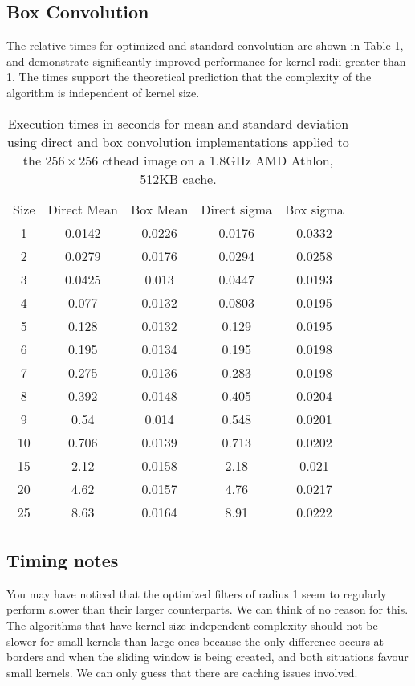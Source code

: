 \documentclass{InsightArticle}
\begin{document}
\subsection{Box Convolution}
The relative times for optimized and standard convolution are shown in
Table \ref{tab:perfBoxConv}, and demonstrate significantly improved
performance for kernel radii greater than 1. The times support the
theoretical prediction that the complexity of the algorithm is
independent of kernel size.
\begin{table}[htbp]
\centering
\begin{tabular}{ccccc}
\hline
Size  &  Direct Mean &  Box Mean & Direct sigma & Box sigma\\
1    &   0.0142 & 0.0226 & 0.0176 & 0.0332 \\
2    &   0.0279 & 0.0176 & 0.0294 & 0.0258 \\
3    &   0.0425 & 0.013  & 0.0447 & 0.0193 \\
4    &   0.077  & 0.0132 & 0.0803 & 0.0195 \\
5    &   0.128  & 0.0132 & 0.129  & 0.0195 \\
6    &   0.195  & 0.0134 & 0.195  & 0.0198 \\
7    &   0.275  & 0.0136 & 0.283  & 0.0198 \\
8    &   0.392  & 0.0148 & 0.405  & 0.0204 \\
9    &   0.54   & 0.014  & 0.548  & 0.0201 \\
10   &   0.706  & 0.0139 & 0.713  & 0.0202 \\
15   &   2.12   & 0.0158 & 2.18   & 0.021 \\
20   &   4.62   & 0.0157 & 4.76   & 0.0217 \\
25   &   8.63   & 0.0164 & 8.91   & 0.0222 \\
\hline
\hline
\end{tabular}
\caption{Execution times in seconds for mean and standard deviation using direct and box convolution implementations applied to the $256 \times 256$ cthead image on a 1.8GHz AMD Athlon, 512KB cache.\label{tab:perfBoxConv}}
\end{table}
\subsection{Timing notes}
You may have noticed that the optimized filters of radius 1 seem to
regularly perform slower than their larger counterparts. We can think
of no reason for this. The algorithms that have kernel size
independent complexity should not be slower for small kernels than
large ones because the only difference occurs at borders and when the
sliding window is being created, and both situations favour small
kernels. We can only guess that there are caching issues involved.
\end{document}
